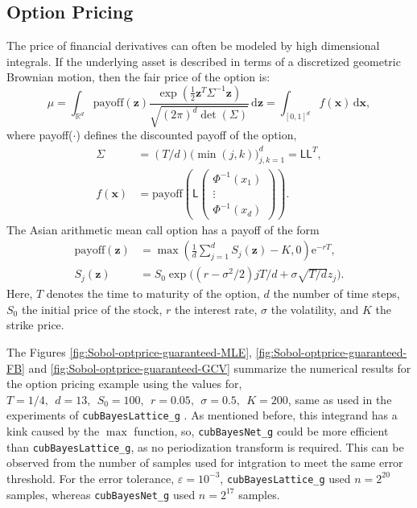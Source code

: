 \documentclass[graybox,footinfo]{svmult}
\newcommand{\bm}[1]{\boldsymbol{#1}}
\newcommand{\mSigma}{\mathsf{\Sigma}}
\newcommand{\dif}[1]{\text{d}{#1}}
\newcommand{\reals}{\mathbb{R}}
\newcommand{\vx}{\bm{x}}
\newcommand{\dvx}{\dif{\bm{x}}}
\newcommand{\vz}{\bm{z}}
\newcommand{\dvz}{\dif{\bm{z}}}
\newcommand{\mL}{\mathsf{L}}
\newcommand{\me}{\mathrm{e}}
\newcommand{\code}[1]{\texttt{#1}}
\begin{document}
\subsection{Option Pricing}

The price of financial derivatives can often be modeled by high dimensional integrals. If the underlying asset is described in terms of a discretized geometric Brownian motion, then the fair price of the option is:
\begin{equation*}
\mu = \int_{\reals^d} \text{payoff}(\vz) \frac{\exp(\frac 12 \vz^T\mSigma^{-1}\vz)}{\sqrt{(2\pi)^d \det(\mSigma)}} \, \dvz = \int_{[0,1]^d} f(\vx) \, \dvx,
\end{equation*} 
where {payoff($\cdot$)} defines the discounted payoff of the option,
\begin{align*}
\mSigma &= (T/d) \bigl(\min(j,k) \bigr)_{j,k=1}^d = \mL \mL^T,\\
f(\vx) &= \text{payoff} \left(\mL 
\begin{pmatrix}
\Phi^{-1}(x_1) \\ \vdots \\ \Phi^{-1}(x_d)
\end{pmatrix} \right).
\end{align*}
The Asian arithmetic mean call option has a payoff of the form
\begin{align*}
\text{payoff}(\vz) &= \max\left( \frac 1d  \sum_{j=1}^d S_j(\vz) - K, 0 \right) \me^{-r T}, \\
S_j(\vz) &= S_0 \exp\bigl((r-\sigma^2/2)jT/d + \sigma \sqrt{T/d} z_j \bigr).
\end{align*}
Here, $T$ denotes the time to maturity of the option, $d$ the number of time steps, $S_0$ the initial price of the stock, $r$ the interest rate, $\sigma$ the volatility, and $K$ the strike price.  

The Figures \ref{fig:Sobol-optprice-guaranteed-MLE}, \ref{fig:Sobol-optprice-guaranteed-FB} and 
\ref{fig:Sobol-optprice-guaranteed-GCV} summarize the numerical results for the option pricing example using the values for,
$
T = 1/4, \ \ d = 13, \ \ S_0 = 100, \ \ r =  0.05, \ \ \sigma = 0.5, \ \ K = 200
$, same as used in the experiments of \code{cubBayesLattice\_g} \cite{RatHic19a}.
As mentioned before, this integrand has a kink caused by the $\max$ function, so, \code{cubBayesNet\_g} could be more efficient than \code{cubBayesLattice\_g}, as no periodization transform is required. This can be observed from the number of samples used for intgration to meet the same error threshold. For the error tolerance, $\varepsilon=10^{-3}$,  \code{cubBayesLattice\_g} used $n=2^{20}$ samples, whereas \code{cubBayesNet\_g} used $n=2^{17}$ samples.
\end{document}

